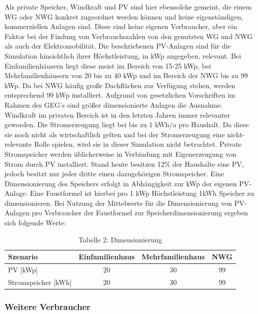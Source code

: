 Als private Speicher, Windkraft und PV sind hier ebensolche gemeint, die einem WG oder NWG konkret zugeordnet werden können und keine eigenständigen, kommerziellen Anlagen sind. 
Diese sind keine eigenen Verbraucher, aber ein Faktor bei der Findung von Verbrauchszahlen von den genutzten WG und NWG als auch der Elektromobilität.
Die beschriebenen PV-Anlagen sind für die Simulation hinsichtlich ihrer Höchstleistung, in kWp angegeben, relevant. 
Bei Einfamilienhäusern liegt diese meist im Bereich von 15-25 kWp, bei Mehrfamilienhäusern von 20 bis zu 40 kWp und im Bereich der NWG bis zu 99 kWp. 
Da bei NWG häufig große Dachflächen zur Verfügung stehen, werden entsprechend 99 kWp installiert. 
Aufgrund von gesetzlichen Vorschriften im Rahmen des GEG’s sind größer dimensionierte Anlagen die Ausnahme.
Windkraft im privaten Bereich ist in den letzten Jahren immer relevanter geworden. 
Die Stromerzeugung liegt bei bis zu 1 kWh/a pro Haushalt. 
Da diese sie noch nicht als wirtschaftlich gelten und bei der Stromerzeugung eine nicht-relevante Rolle spielen, wird sie in dieser Simulation nicht betrachtet.
Private Stromspeicher werden üblicherweise in Verbindung mit Eigenerzeugung von Strom durch PV installiert. 
Stand heute besitzen 12\% der Haushalte eine PV, jedoch besitzt nur jeder dritte einen dazugehörigen Stromspeicher. 
Eine Dimensionierung des Speichers erfolgt in Abhängigkeit zur kWp der eigenen PV-Anlage. 
Eine Faustformel ist hierbei pro 1 kWp Höchstleistung 1kWh Speicher zu dimensionieren. 
Bei Nutzung der Mittelwerte für die Dimensionierung von PV-Anlagen pro Verbraucher der Faustformel zur Speicherdimensionierung ergeben sich folgende Werte:

\begin{table}[htbp]
    \centering
    \caption{Tabelle 2: Dimensionierung}
    \label{tab:dimensionierung}
    \begin{tabular}{lccc}
        \toprule
        \textbf{Szenario} & \textbf{Einfamilienhaus} & \textbf{Mehrfamilienhaus} & \textbf{NWG} \\
        \midrule
        PV [kWp] & 20 & 30 & 99 \\
        Stromspeicher [kWh] & 20 & 30 & 99 \\
        \bottomrule
    \end{tabular}
\end{table}

\subsubsection{Weitere Verbraucher}

